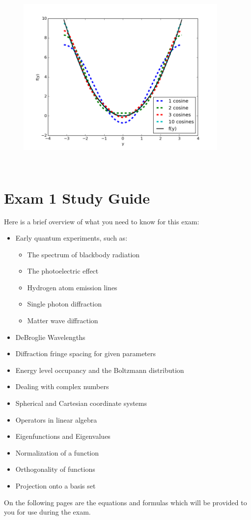 \documentclass[12pt, openany, letterpaper]{memoir}
\begin{document}
\begin{figure}[]
  \centering
  \includegraphics[width=0.93\textwidth]{figures/Fourier}
\end{figure}

\newpage
~
\newpage
\section*{Exam 1 Study Guide}

Here is a brief overview of what you need to know for this exam:

\begin{itemize}
	\item Early quantum experiments, such as:
	\begin{itemize}
		\item The spectrum of blackbody radiation
		\item The photoelectric effect
		\item Hydrogen atom emission lines
		\item Single photon diffraction
		\item Matter wave diffraction
	\end{itemize}
	\item DeBroglie Wavelengths
	\item Diffraction fringe spacing for given parameters
	\item Energy level occupancy and the Boltzmann distribution
	\item Dealing with complex numbers
	\item Spherical and Cartesian coordinate systems
	\item Operators in linear algebra
	\item Eigenfunctions and Eigenvalues
	\item Normalization of a function
	\item Orthogonality of functions
	\item Projection onto a basis set
\end{itemize}
On the following pages are the equations and formulas which will be provided to you for use during the exam.


\end{document}
